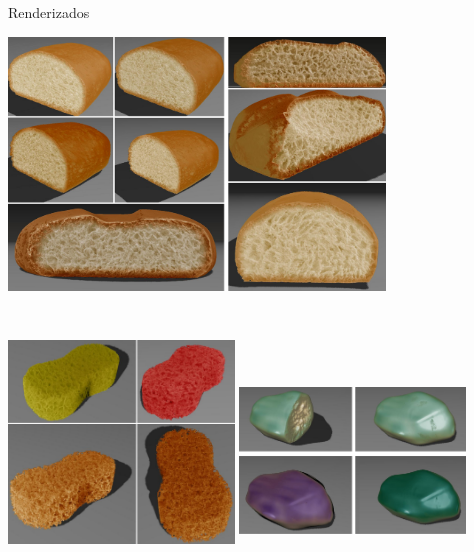 \documentclass[spanish,unknownkeysallowed]{beamer}
\begin{document}
\begin{frame}{Renderizados}

\centerline{\includegraphics[width=10cm]{../figures/Fig12CAVW}}
\end{frame}

\begin{frame}{}

\includegraphics[width=6cm, height=7cm]{../figures/Fig13CAVW}
\includegraphics[width=6cm, height=6cm]{../figures/Fig14CAVW}

\end{frame}
\end{document}

